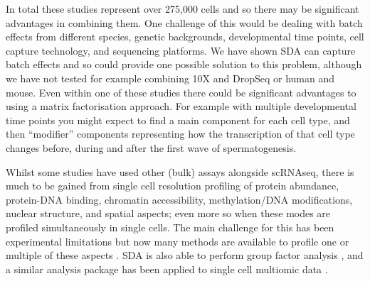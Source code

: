 In total these studies represent over 275,000 cells and so there may be significant advantages in combining them.
One challenge of this would be dealing with batch effects from different species, genetic backgrounds, developmental time points, cell capture technology, and sequencing platforms.
We have shown SDA can capture batch effects and so could provide one possible solution to this problem, although we have not tested for example combining 10X and DropSeq or human and mouse.
Even within one of these studies there could be significant advantages to using a matrix factorisation approach.
For example with multiple developmental time points you might expect to find a main component for each cell type, and then ``modifier'' components representing how the transcription of that cell type changes before, during and after the first wave of spermatogenesis.

Whilst some studies \parencite{Ernst2019Staged} have used other (bulk) assays alongside scRNAseq, there is much to be gained from single cell resolution profiling of protein abundance, protein-DNA binding, chromatin accessibility, methylation/DNA modifications, nuclear structure, and spatial aspects; even more so when these modes are profiled simultaneously in single cells.
The main challenge for this has been experimental limitations but now many methods are available to profile one or multiple of these aspects \parencite[reviewed in][]{Chappell2018SingleCell, Hu2018Single, Stuart2019Integrative, Heriche2019Integrating}.
SDA is also able to perform group factor analysis \parencite{Hore2015Latent}, and a similar analysis package has been applied to single cell multiomic data \parencite{Argelaguet2019Multiomics}.

